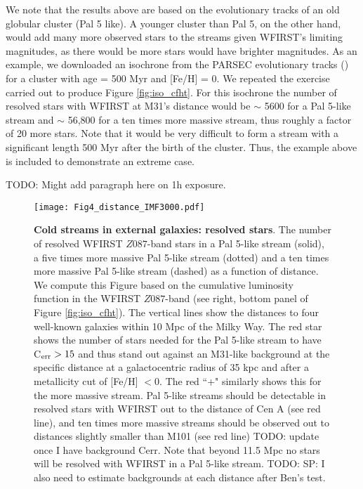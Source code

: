 \documentclass[twocolumn]{aastex62}
\newcommand{\todo}[1]{{\color{red} TODO: #1}}
\begin{document}
We note that the results above are based on the evolutionary tracks of an old globular cluster (Pal 5 like). A younger cluster than Pal 5, on the other hand, would add many more observed stars to the streams given WFIRST's limiting magnitudes, as there would be more stars would have brighter magnitudes. As an example, we downloaded an isochrone from the PARSEC evolutionary tracks (\citealt{bressan12}) for a cluster with age = 500 Myr and  [Fe/H] = 0. We repeated the exercise carried out to produce Figure \ref{fig:iso_cfht}. For this isochrone the number of resolved stars with WFIRST at M31's distance would be ${\sim}$ 5600  for a Pal 5-like stream and ${\sim}$ 56,800 for a ten times more massive stream, thus roughly a factor of 20 more stars. Note that it would be very difficult to form a stream with a significant length 500 Myr after the birth of the cluster. Thus, the example above is included to demonstrate an extreme case.

\todo{Might add paragraph here on 1h exposure.}

\begin{figure}
\centerline{\texttt{[image: Fig4\_distance\_IMF3000.pdf]}}
\caption{{\bf Cold streams in external galaxies: resolved stars}. The number of resolved WFIRST $Z087$-band stars in a Pal 5-like stream (solid), a five times more massive Pal 5-like stream (dotted) and a ten times more massive Pal 5-like stream (dashed) as a function of distance. We compute this Figure based on the cumulative luminosity function in the WFIRST $Z087$-band (see right, bottom panel of Figure \ref{fig:iso_cfht}). The vertical lines show the distances to four well-known galaxies within 10 Mpc of the Milky Way. The red star shows the number of stars needed for the Pal 5-like stream to have  C$_{\rm err} > 15$ and thus stand out against an M31-like background at the specific distance at a galactocentric radius of 35 kpc and after a metallicity cut of [Fe/H] $< 0$. The red ``+" similarly shows this for the more massive stream. 
Pal 5-like streams should be detectable in resolved stars with WFIRST out to the distance of Cen A (see red line), and ten times more massive streams should be observed out to distances slightly smaller than M101 (see red line)\todo{update once I have background Cerr}. %
Note that beyond 11.5 Mpc no stars will be resolved with WFIRST in a Pal 5-like stream. \todo{SP:  I also need to estimate backgrounds at each distance after Ben's test.}}
\label{fig:distance}
\end{figure}
\end{document}
